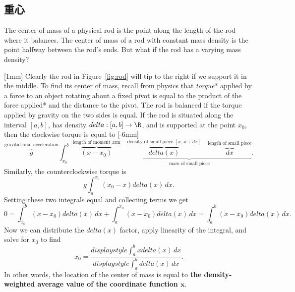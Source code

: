 \documentclass[indent]{watsonbook}
\begin{document}
{\subsection{重心}

The center of mass of a physical rod is the point along the length of
the rod where it balances. The center of mass of a rod with constant
mass density is the point halfway between the rod's ends. But what if
the rod has a varying mass density?

\begin{center}
\end{center}

[1mm] Clearly the rod in Figure~\ref{fig:rod} will tip to
the right if we support it in the middle. To find its center of mass,
recall from physics that \textit{torque}* applied by a force to an
object rotating about a fixed pivot is equal to the product of the
force applied* and the distance to the pivot. The rod is balanced if
the torque applied by gravity on the two sides is equal. If the rod is
situated along the interval $[a,b]$, has density
${d}elta:[a,b] \to \R$, and is supported at the point $x_0$, then the
clockwise torque is equal to [-6mm]
\[
  \overbrace{g}^{\text{gravitational acceleration}}\int_{x_0}^b
  \overbrace{(x-x_0)}^{\text{length of moment arm}} \quad
  \underbrace{\overbrace{{d}elta(x)}^{\text{density of small piece
      }[x,\, x+{d} x]} \quad \overbrace{{d} x}^{\text{length of small
        piece}}}_{\text{mass of small piece}}.
\]
Similarly, the counterclockwise torque is
\[
  g\int_{a}^{x_0} (x_0-x){d}elta(x) \, {d} x.
\]
Setting these two integrals equal and collecting terms we get
\[
  0 = \int_{x_0}^{b} (x-x_0){d}elta(x) \, {d} x + \int_{a}^{x_0} (x-x_0){d}elta(x) \, {d} x =
  \int_{a}^{b} (x-x_0){d}elta(x) \, {d} x.
\]
Now we can distribute the ${d}elta(x)$ factor, apply linearity of the
integral, and solve for $x_0$ to find
\[
  x_0 = \frac{{d}isplaystyle{\int_a^b x {d}elta(x) \, {d} x}}{{d}isplaystyle{\int_a^b {d}elta(x) \, {d} x}}.
\]
In other words, the location of the center of mass is equal to
\textbf{the density-weighted average value of the coordinate function
  $\mathbf{x}$}.

}
\end{document}
